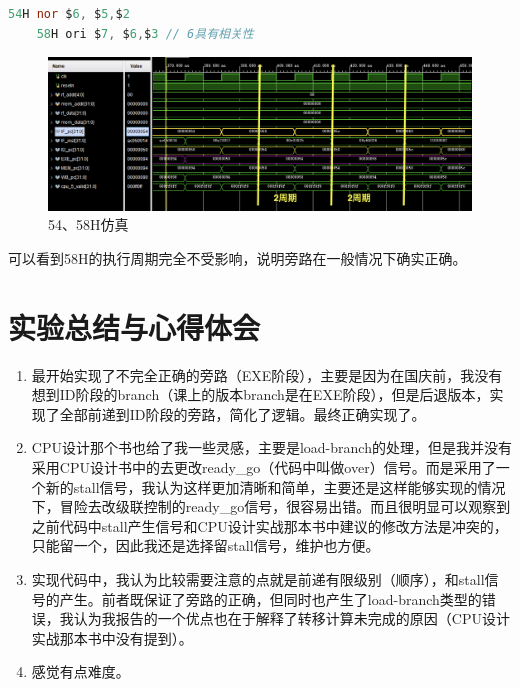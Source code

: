 \documentclass[a4paper]{article}
\begin{document}
\begin{lstlisting}[language=Verilog]
    54H nor $6, $5,$2 
    58H ori $7, $6,$3 // 6具有相关性
\end{lstlisting}


\begin{figure}[H]
    \centering
    \includegraphics[width=\linewidth]{img/顺序图片/5458.png}
    \caption{54、58H仿真}
\end{figure}

可以看到58H的执行周期完全不受影响，说明旁路在一般情况下确实正确。

\newpage
\section{实验总结与心得体会}

\begin{enumerate}
    \item 最开始实现了不完全正确的旁路（EXE阶段），主要是因为在国庆前，我没有想到ID阶段的branch（课上的版本branch是在EXE阶段），但是后退版本，实现了全部前递到ID阶段的旁路，简化了逻辑。最终正确实现了。
    \item CPU设计那个书也给了我一些灵感，主要是load-branch的处理，但是我并没有采用CPU设计书中的去更改ready\_go（代码中叫做over）信号。而是采用了一个新的stall信号，我认为这样更加清晰和简单，主要还是这样能够实现的情况下，冒险去改级联控制的ready\_go信号，很容易出错。而且很明显可以观察到之前代码中stall产生信号和CPU设计实战那本书中建议的修改方法是冲突的，只能留一个，因此我还是选择留stall信号，维护也方便。
    \item 实现代码中，我认为比较需要注意的点就是前递有限级别（顺序），和stall信号的产生。前者既保证了旁路的正确，但同时也产生了load-branch类型的错误，我认为我报告的一个优点也在于解释了转移计算未完成的原因（CPU设计实战那本书中没有提到）。
    \item 感觉有点难度。
\end{enumerate}
    

\label{LastPage}
\end{document}
